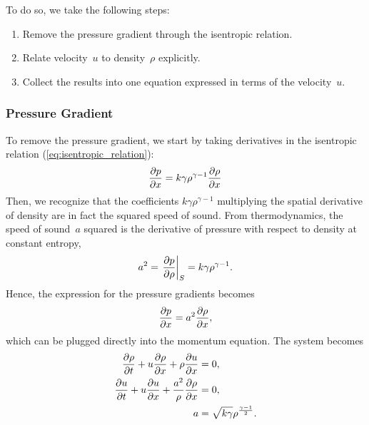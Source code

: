 \documentclass[../../thesis.tex]{subfiles}
\begin{document}
To do so, we take the following steps:
\begin{enumerate}
    \item Remove the pressure gradient through the isentropic relation. 
    \item Relate velocity~$u$ to density~$\rho$ explicitly. %
    \item Collect the results into one equation expressed in terms of the velocity~$u$.
\end{enumerate}

\subsubsection*{Pressure Gradient}
To remove the pressure gradient, we start by taking derivatives in the isentropic relation (\ref{eq:isentropic_relation}):
\begin{equation}
    \pdv{p}{x} = k \gamma \rho^{\gamma-1} \pdv{\rho}{x}
\end{equation}
Then, we recognize that the coefficients $k \gamma \rho^{\gamma-1}$ multiplying the spatial derivative of density are in fact the squared speed of sound.
From thermodynamics, the speed of sound~$a$ squared is the derivative of pressure with respect to density at constant entropy,
\begin{equation}
    a^2 = \left.\pdv{p}{\rho}\right|_S = k \gamma \rho^{\gamma-1}.
\end{equation}
Hence, the expression for the pressure gradients becomes
\begin{equation}
    \pdv{p}{x} = a^2 \pdv{\rho}{x},
\end{equation}
which can be plugged directly into the momentum equation. 
The system becomes
\begin{subequations}
\begin{align}
        \pdv{\rho}{t} + u \pdv{\rho}{x} + \rho \pdv{u}{x} &= 0, \\ 
        \pdv{u}{t} + u \pdv{u}{x} + \frac{a^2}{\rho}\pdv{\rho}{x} &= 0, \\
        a &= \sqrt{k \gamma} \rho^{\frac{\gamma-1}{2}}. 
\end{align}
\end{subequations}
\end{document}

